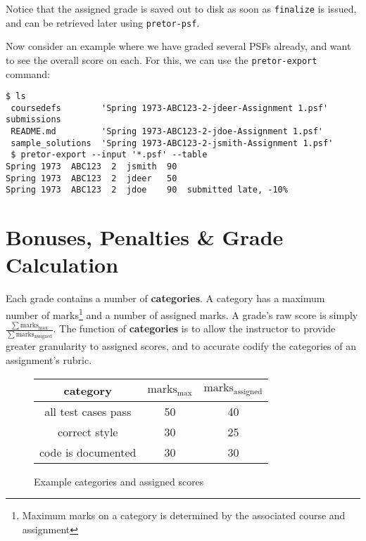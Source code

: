 \documentclass{book}
\begin{document}
Notice that the assigned grade is saved out to disk as soon as
\texttt{finalize} is issued, and can be retrieved later using
\texttt{pretor-psf}.

Now consider an example where we have graded several PSFs already, and want to
see the overall score on each. For this, we can use the \texttt{pretor-export}
command:

\begin{verbatim}
$ ls
 coursedefs        'Spring 1973-ABC123-2-jdeer-Assignment 1.psf'    submissions
 README.md         'Spring 1973-ABC123-2-jdoe-Assignment 1.psf'
 sample_solutions  'Spring 1973-ABC123-2-jsmith-Assignment 1.psf'
 $ pretor-export --input '*.psf' --table
Spring 1973  ABC123  2  jsmith  90
Spring 1973  ABC123  2  jdeer   50
Spring 1973  ABC123  2  jdoe    90  submitted late, -10%
\end{verbatim}

\section{Bonuses, Penalties \& Grade Calculation}

Each grade contains a number of \textbf{categories}. A category has a maximum
number of marks\footnote{Maximum marks on a category is determined by the
associated course and assignment} and a number of assigned marks. A grade's raw
score is simply
$\frac{\sum\text{marks}_\text{max}}{\sum\text{marks}_\text{assigned}}$. The
function of \textbf{categories} is to allow the instructor to provide greater
granularity to assigned scores, and to accurate codify the categories of
an assignment's rubric.

\begin{wrapfigure}{l}{0.5\textwidth}

	\centering

	\begin{tabular}{c | c | c}

		category & $\text{marks}_\text{max}$ & $\text{marks}_\text{assigned}$ \\
		\hline\hline
		all test cases pass & 50 & 40 \\
		\hline
		correct style & 30 & 25 \\
		\hline
		code is documented & 30 & 30 \\

	\end{tabular}

	\caption{\label{fig:category_example} Example categories and assigned
	scores}

\end{wrapfigure}
\end{document}
